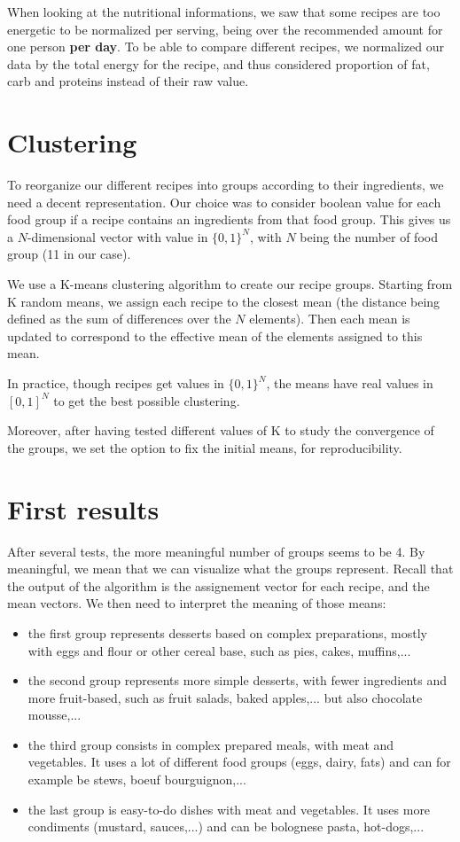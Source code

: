 \documentclass[11pt]{article}
\begin{document}
When looking at the nutritional informations, we saw that some recipes are too energetic to be normalized per serving, being over the recommended amount for one person \textbf{per day}. To be able to compare different recipes, we normalized our data by the total energy for the recipe, and thus considered proportion of fat, carb and proteins instead of their raw value.

\section{Clustering}
To reorganize our different recipes into groups according to their ingredients, we need a decent representation. Our choice was to consider boolean value for each food group if a recipe contains an ingredients from that food group. This gives us a $N$-dimensional vector with value in $\{0,1\}^{N}$, with $N$ being the number of food group (11 in our case).

We use a K-means clustering algorithm to create our recipe groups. Starting from K random means, we assign each recipe to the closest mean (the distance being defined as the sum of differences over the $N$ elements). Then each mean is updated to correspond to the effective mean of the elements assigned to this mean.

In practice, though recipes get values in $\{0,1\}^{N}$, the means have real values in $[0,1]^{N}$ to get the best possible clustering.

Moreover, after having tested different values of K to study the convergence of the groups, we set the option to fix the initial means, for reproducibility.

\section{First results}
After several tests, the more meaningful number of groups seems to be 4. By meaningful, we mean that we can visualize what the groups represent. Recall that the output of the algorithm is the assignement vector for each recipe, and the mean vectors. We then need to interpret the meaning of those means:

\begin{itemize}
\item the first group represents desserts based on complex preparations, mostly with eggs and flour or other cereal base, such as pies, cakes, muffins,...
\item the second group represents more simple desserts, with fewer ingredients and more fruit-based, such as fruit salads, baked apples,... but also chocolate mousse,...
\item the third group consists in complex prepared meals, with meat and vegetables. It uses a lot of different food groups (eggs, dairy, fats) and can for example be stews, boeuf bourguignon,...
\item the last group is easy-to-do dishes with meat and vegetables. It uses more condiments (mustard, sauces,...) and can be bolognese pasta, hot-dogs,...
\end{itemize}
\end{document}
